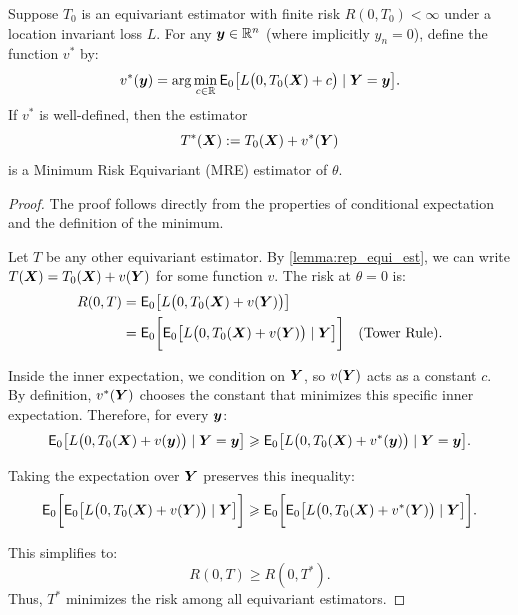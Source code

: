 \begin{theo}
\label{thm:mre_construction}
Suppose \(T_0\) is an equivariant estimator with finite risk \(R(0, T_0) < \infty\) under a location invariant loss \(L\). For any \(\boldsymbol{y} \in \mathbb{R}^n\) (where implicitly \(y_n = 0\)), define the function \(v^*\) by:
\begin{equation}
v^*(\boldsymbol{y}) = \arg\min_{c \in \mathbb{R}} \mathsf{E}_0 \big[ L \big( 0, T_0(\boldsymbol{X}) + c \big) \mid \boldsymbol{Y} = \boldsymbol{y} \big].
\label{eq:optimal_v}
\end{equation}
If \(v^*\) is well-defined, then the estimator
\[
T^*(\boldsymbol{X}) := T_0(\boldsymbol{X}) + v^*(\boldsymbol{Y})
\]
is a Minimum Risk Equivariant (MRE) estimator of \(\theta\).
\end{theo}

\begin{proof}
The proof follows directly from the properties of conditional expectation and the definition of the minimum.

Let \(T\) be any other equivariant estimator. By \autoref{lemma:rep_equi_est}, we can write \(T(\boldsymbol{X}) = T_0(\boldsymbol{X}) + v(\boldsymbol{Y})\) for some function \(v\). The risk at \(\theta=0\) is:
\begin{align*}
    R(0, T) &= \mathsf{E}_{0} \big[ L \big( 0, T_{0}(\boldsymbol{X}) + v(\boldsymbol{Y}) \big) \big] \\
    &= \mathsf{E}_{0} \bigg[ \mathsf{E}_{0} \big[ L \big( 0, T_{0}(\boldsymbol{X}) + v(\boldsymbol{Y}) \big) \mid \boldsymbol{Y} \big] \bigg] \quad (\text{Tower Rule}).
\end{align*}

Inside the inner expectation, we condition on \(\boldsymbol{Y}\), so \(v(\boldsymbol{Y})\) acts as a constant \(c\). By definition, \(v^*(\boldsymbol{Y})\) chooses the constant that minimizes this specific inner expectation. Therefore, for every \(\boldsymbol{y}\):
\[
\mathsf{E}_{0} \big[ L \big( 0, T_{0}(\boldsymbol{X}) + v(\boldsymbol{y}) \big) \mid \boldsymbol{Y}=\boldsymbol{y} \big] \geqslant \mathsf{E}_{0} \big[ L \big( 0, T_{0}(\boldsymbol{X}) + v^*(\boldsymbol{y}) \big) \mid \boldsymbol{Y}=\boldsymbol{y} \big].
\]

Taking the expectation over \(\boldsymbol{Y}\) preserves this inequality:
\[
\mathsf{E}_{0} \bigg[ \mathsf{E}_{0} \big[ L \big( 0, T_{0}(\boldsymbol{X}) + v(\boldsymbol{Y}) \big) \mid \boldsymbol{Y} \big] \bigg] \geqslant \mathsf{E}_{0} \bigg[ \mathsf{E}_{0} \big[ L \big( 0, T_{0}(\boldsymbol{X}) + v^*(\boldsymbol{Y}) \big) \mid \boldsymbol{Y} \big] \bigg].
\]

This simplifies to:
\[
R(0, T) \geq R(0, T^*).
\]
Thus, \(T^*\) minimizes the risk among all equivariant estimators.
\end{proof}

